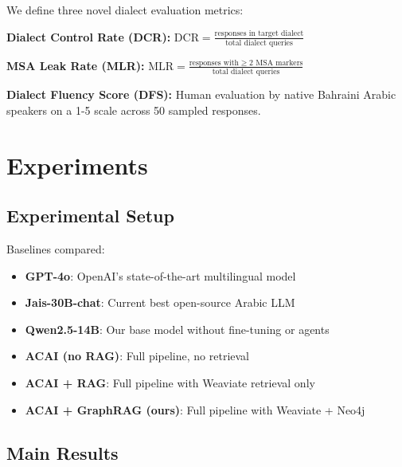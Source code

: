 \documentclass[11pt]{article}
\begin{document}
We define three novel dialect evaluation metrics:

\textbf{Dialect Control Rate (DCR):}
$\text{DCR} = \frac{\text{responses in target dialect}}{\text{total dialect queries}}$

\textbf{MSA Leak Rate (MLR):}
$\text{MLR} = \frac{\text{responses with} \geq 2 \text{ MSA markers}}{\text{total dialect queries}}$

\textbf{Dialect Fluency Score (DFS):} Human evaluation by native Bahraini
Arabic speakers on a 1-5 scale across 50 sampled responses.

\section{Experiments}

\subsection{Experimental Setup}
Baselines compared:
\begin{itemize}
  \item \textbf{GPT-4o}: OpenAI's state-of-the-art multilingual model
  \item \textbf{Jais-30B-chat}: Current best open-source Arabic LLM
  \item \textbf{Qwen2.5-14B}: Our base model without fine-tuning or agents
  \item \textbf{ACAI (no RAG)}: Full pipeline, no retrieval
  \item \textbf{ACAI + RAG}: Full pipeline with Weaviate retrieval only
  \item \textbf{ACAI + GraphRAG (ours)}: Full pipeline with Weaviate + Neo4j
\end{itemize}

\subsection{Main Results}
\end{document}

